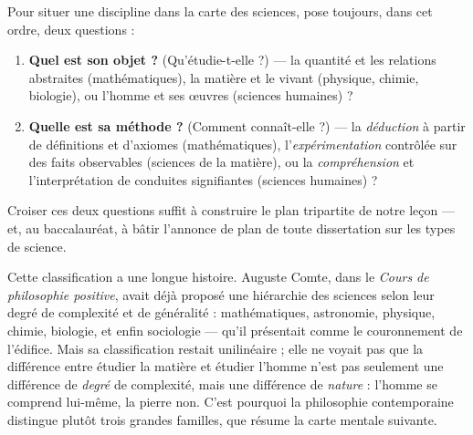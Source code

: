\documentclass[11pt]{article}
\begin{document}
\begin{methode}
Pour situer une discipline dans la carte des sciences, pose toujours, dans cet ordre, deux questions :
\begin{enumerate}
\item \textbf{Quel est son objet ?} (Qu'étudie-t-elle ?) — la quantité et les relations abstraites (mathématiques), la matière et le vivant (physique, chimie, biologie), ou l'homme et ses œuvres (sciences humaines) ?
\item \textbf{Quelle est sa méthode ?} (Comment connaît-elle ?) — la \emph{déduction} à partir de définitions et d'axiomes (mathématiques), l'\emph{expérimentation} contrôlée sur des faits observables (sciences de la matière), ou la \emph{compréhension} et l'interprétation de conduites signifiantes (sciences humaines) ?
\end{enumerate}
Croiser ces deux questions suffit à construire le plan tripartite de notre leçon — et, au baccalauréat, à bâtir l'annonce de plan de toute dissertation sur les types de science.
\end{methode}

Cette classification a une longue histoire. Auguste Comte, dans le \emph{Cours de philosophie positive}, avait déjà proposé une hiérarchie des sciences selon leur degré de complexité et de généralité : mathématiques, astronomie, physique, chimie, biologie, et enfin sociologie — qu'il présentait comme le couronnement de l'édifice. Mais sa classification restait unilinéaire ; elle ne voyait pas que la différence entre étudier la matière et étudier l'homme n'est pas seulement une différence de \emph{degré} de complexité, mais une différence de \emph{nature} : l'homme se comprend lui-même, la pierre non. C'est pourquoi la philosophie contemporaine distingue plutôt trois grandes familles, que résume la carte mentale suivante.
\end{document}
